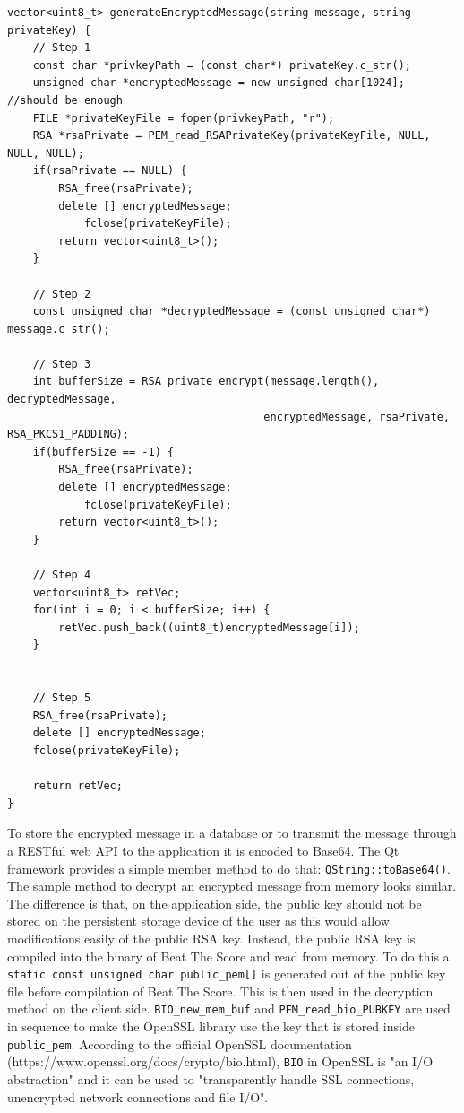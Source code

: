 \begin{lstlisting}
vector<uint8_t> generateEncryptedMessage(string message, string privateKey) {
    // Step 1
    const char *privkeyPath = (const char*) privateKey.c_str();
    unsigned char *encryptedMessage = new unsigned char[1024]; //should be enough
    FILE *privateKeyFile = fopen(privkeyPath, "r");
    RSA *rsaPrivate = PEM_read_RSAPrivateKey(privateKeyFile, NULL, NULL, NULL);
    if(rsaPrivate == NULL) {
	    RSA_free(rsaPrivate);
	    delete [] encryptedMessage;
    	    fclose(privateKeyFile);
        return vector<uint8_t>();
    }

    // Step 2
    const unsigned char *decryptedMessage = (const unsigned char*) message.c_str();
    
    // Step 3
    int bufferSize = RSA_private_encrypt(message.length(), decryptedMessage,
                                        encryptedMessage, rsaPrivate, RSA_PKCS1_PADDING);
    if(bufferSize == -1) {
        RSA_free(rsaPrivate);
	    delete [] encryptedMessage;
    	    fclose(privateKeyFile);
        return vector<uint8_t>();
    }

    // Step 4
    vector<uint8_t> retVec;
    for(int i = 0; i < bufferSize; i++) {
        retVec.push_back((uint8_t)encryptedMessage[i]);
    }


    // Step 5
    RSA_free(rsaPrivate);
    delete [] encryptedMessage;
    fclose(privateKeyFile);

    return retVec;
}
\end{lstlisting}

To store the encrypted message in a database or to transmit the message through a RESTful web API to the application it is encoded to Base64. The Qt framework provides a simple member method to do that: {\tt QString::toBase64()}. The sample method to decrypt an encrypted message from memory looks similar. The difference is that, on the application side, the public key should not be stored on the persistent storage device of the user as this would allow modifications easily of the public RSA key. Instead, the public RSA key is compiled into the binary of Beat The Score and read from memory. To do this a {\tt static const unsigned char public\_pem[]} is generated out of the public key file before compilation of Beat The Score. This is then used in the decryption method on the client side. {\tt BIO\_new\_mem\_buf} and {\tt PEM\_read\_bio\_PUBKEY} are used in sequence to make the OpenSSL library use the key that is stored inside {\tt public\_pem}. According to the official OpenSSL documentation (https://www.openssl.org/docs/crypto/bio.html), {\tt BIO} in OpenSSL is "an I/O abstraction" and it can be used to "transparently handle SSL connections, unencrypted network connections and file I/O".

